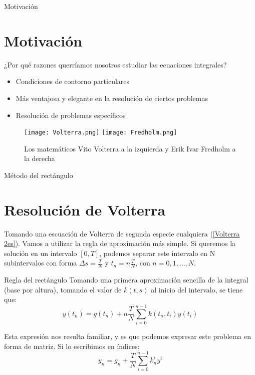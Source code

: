 \documentclass{beamer}
\begin{document}
\begin{frame}{Motivación}
    \section{Motivación}
    ¿Por qué razones querríamos nosotros estudiar las ecuaciones integrales?
    \begin{itemize}
        \item Condiciones de contorno particulares 
        \item Más ventajosa y elegante en la resolución de ciertos problemas
        \item Resolución de problemas específicos
    \end{itemize}
    \begin{figure}
        \centering
        \texttt{[image: Volterra.png]}
        \texttt{[image: Fredholm.png]}
        \caption{Los matemáticos Vito Volterra a la izquierda y Erik Ivar Fredholm a la derecha}
        \label{fig:enter-label}
    \end{figure}  
\end{frame}

\begin{frame}{Método del rectángulo \cite{10.1093/comjnl/12.4.393}}\section{Resolución de Volterra}
    Tomando una escuación de Volterra de segunda especie cualquiera (\ref{Volterra 2es}). Vamos a utilizar la regla de aproximación más simple. Si queremos la solución en un intervalo $[0, T]$, podemos separar este intervalo en N subintervalos con forma $\Delta s = \frac{T}{N}$ y $t_n = n \frac{T}{N}$, con $n=0, 1, \ldots, N$.
    \begin{block}{Regla del rectángulo}
        Tomando una primera aproximación sencilla de la integral (base por altura), tomando el valor de $k(t, s)$ al inicio del intervalo, se tiene que:
        \begin{equation}
            y(t_n) = g(t_n) + n\frac{T}{N} \sum_{i=0}^{n-1} k(t_n, t_i) y(t_i)
        \end{equation}
    \end{block}
    Esta expresión nos resulta familiar, y es que podemos expresar este problema en forma de matriz. Si lo escribimos en índices:
    $$
    y_n = g_n + \frac{T}{N} \sum_{i=0}^{n-1} k_n^i y^i
    $$
\end{frame}
\end{document}
